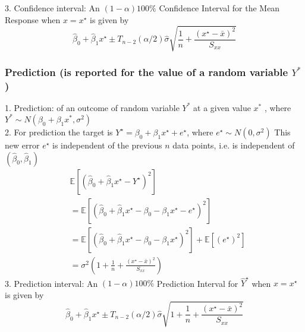 \documentclass[11pt,a4paper]{article}
\begin{document}
3. Conﬁdence interval: An $(1-\alpha) 100 \%$ Confidence Interval for the Mean Response when $x=x^{\star}$ is given by
$$
\hat{\beta}_{0}+\hat{\beta}_{1} x^{\star} \pm T_{n-2}(\alpha / 2) \hat{\sigma} \sqrt{\frac{1}{n}+\frac{\left(x^{\star}-\bar{x}\right)^{2}}{S_{x x}}}
$$

\subsubsection{Prediction (is reported for the value of a random variable $Y^*$)}
1. Prediction: of an outcome of random variable $Y^*$ at a given value $x^*$ , where $Y^* \sim N( \beta_0 + \beta_1 x^* , \sigma^2 )$\\
2. For prediction the target is $Y^{\star}=\beta_{0}+\beta_{1} x^{\star}+e^{\star}$, where $e^{\star} \sim N\left(0, \sigma^{2}\right)$ This new error $e^{\star}$ is independent of the previous $n$ data points, i.e. is independent of $\left(\hat{\beta}_{0}, \hat{\beta}_{1}\right)$
$$
\begin{aligned}
&\mathbb{E}\left[\left(\hat{\beta}_{0}+\hat{\beta}_{1} x^{\star}-Y^{\star}\right)^{2}\right] \\
&=\mathbb{E}\left[\left(\hat{\beta}_{0}+\hat{\beta}_{1} x^{\star}-\beta_{0}-\beta_{1} x^{\star}-e^{\star}\right)^{2}\right] \\
&=\mathbb{E}\left[\left(\hat{\beta}_{0}+\hat{\beta}_{1} x^{\star}-\beta_{0}-\beta_{1} x^{\star}\right)^{2}\right]+\mathbb{E}\left[\left(e^{\star}\right)^{2}\right] \\
&=\sigma^{2}\left(1+\frac{1}{n}+\frac{\left(x^{\star}-\bar{x}\right)^{2}}{S_{x x}}\right)
\end{aligned}
$$
3. Prediction interval: An $(1-\alpha) 100 \%$ Prediction Interval for $\hat{Y}^{\star}$ when $x=x^{\star}$ is given by
$$
\hat{\beta}_{0}+\hat{\beta}_{1} x^{\star} \pm T_{n-2}(\alpha / 2) \hat{\sigma} \sqrt{1+\frac{1}{n}+\frac{\left(x^{\star}-\bar{x}\right)^{2}}{S_{x x}}}
$$
\end{document}
